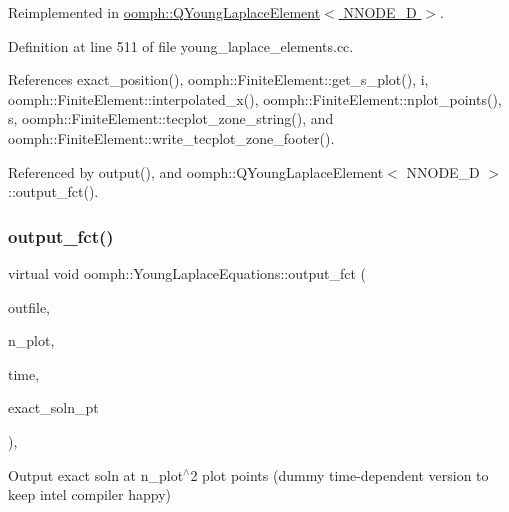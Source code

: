 Reimplemented in \hyperlink{classoomph_1_1QYoungLaplaceElement_a617863102f725a73a8768ba8e3da896d}{oomph\+::\+Q\+Young\+Laplace\+Element$<$ N\+N\+O\+D\+E\+\_\+D $>$}.



Definition at line 511 of file young\+\_\+laplace\+\_\+elements.\+cc.



References exact\+\_\+position(), oomph\+::\+Finite\+Element\+::get\+\_\+s\+\_\+plot(), i, oomph\+::\+Finite\+Element\+::interpolated\+\_\+x(), oomph\+::\+Finite\+Element\+::nplot\+\_\+points(), s, oomph\+::\+Finite\+Element\+::tecplot\+\_\+zone\+\_\+string(), and oomph\+::\+Finite\+Element\+::write\+\_\+tecplot\+\_\+zone\+\_\+footer().



Referenced by output(), and oomph\+::\+Q\+Young\+Laplace\+Element$<$ N\+N\+O\+D\+E\+\_\+D $>$\+::output\+\_\+fct().

\mbox{\label{classoomph_1_1YoungLaplaceEquations_a53c0bf42a2e2a4469cb7f6afe235c141}} 
\subsubsection{\texorpdfstring{output\+\_\+fct()}{output\_fct()}\hspace{0.1cm}{\footnotesize\ttfamily [2/2]}}
{\footnotesize\ttfamily virtual void oomph\+::\+Young\+Laplace\+Equations\+::output\+\_\+fct (\begin{DoxyParamCaption}\item[{std\+::ostream \&}]{outfile,  }\item[{const unsigned \&}]{n\+\_\+plot,  }\item[{const double \&}]{time,  }\item[{\hyperlink{classoomph_1_1FiniteElement_ad4ecf2b61b158a4b4d351a60d23c633e}{Finite\+Element\+::\+Unsteady\+Exact\+Solution\+Fct\+Pt}}]{exact\+\_\+soln\+\_\+pt }\end{DoxyParamCaption})\hspace{0.3cm}{\ttfamily [inline]}, {\ttfamily [virtual]}}



Output exact soln at n\+\_\+plot$^\wedge$2 plot points (dummy time-\/dependent version to keep intel compiler happy) 



